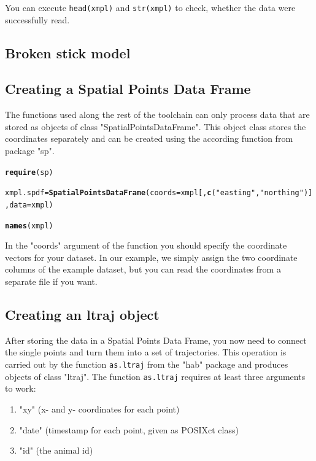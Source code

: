 \documentclass[11pt, a4paper]{article}\usepackage[]{graphicx}\usepackage[]{color}
\makeatletter
\newcommand{\hlstr}[1]{\textcolor[rgb]{0.192,0.494,0.8}{#1}}%
\newcommand{\hlstd}[1]{\textcolor[rgb]{0.345,0.345,0.345}{#1}}%
\newcommand{\hlkwb}[1]{\textcolor[rgb]{0.69,0.353,0.396}{#1}}%
\newcommand{\hlkwc}[1]{\textcolor[rgb]{0.333,0.667,0.333}{#1}}%
\newcommand{\hlkwd}[1]{\textcolor[rgb]{0.737,0.353,0.396}{\textbf{#1}}}%
\newenvironment{kframe}{%
 \def\at@end@of@kframe{}%
 \ifinner\ifhmode%
  \def\at@end@of@kframe{\end{minipage}}%
  \begin{minipage}{\columnwidth}%
 \fi\fi%
 \def\FrameCommand##1{\hskip\@totalleftmargin \hskip-\fboxsep
 \colorbox{shadecolor}{##1}\hskip-\fboxsep
     \hskip-\linewidth \hskip-\@totalleftmargin \hskip\columnwidth}%
 \MakeFramed {\advance\hsize-\width
   \@totalleftmargin\z@ \linewidth\hsize
   \@setminipage}}%
 {\par\unskip\endMakeFramed%
 \at@end@of@kframe}
\newenvironment{knitrout}{}{} %
\makeatother
\begin{document}
\noindent You can execute \texttt{head(xmpl)} and \texttt{str(xmpl)} to check, whether the data were successfully read.

\subsection{Broken stick model}

\subsection{Creating a Spatial Points Data Frame}%
The functions used along the rest of the toolchain can only process data that are stored as objects of class "SpatialPointsDataFrame". This object class stores the coordinates separately and can be created using the according function from package "sp". 

\begin{knitrout}
\color{fgcolor}\begin{kframe}
\begin{alltt}
\hlkwd{require}\hlstd{(sp)}

\hlstd{xmpl.spdf} \hlkwb{=} \hlkwd{SpatialPointsDataFrame}\hlstd{(}\hlkwc{coords} \hlstd{= xmpl[,}\hlkwd{c}\hlstd{(}\hlstr{"easting"}\hlstd{,}\hlstr{"northing"}\hlstd{)],} \hlkwc{data} \hlstd{= xmpl)}

\hlkwd{names}\hlstd{(xmpl)}
\end{alltt}
\end{kframe}
\end{knitrout}
In the "coords" argument of the function you should specify the coordinate vectors for your dataset. In our example, we simply assign the two coordinate columns of the example dataset, but you can read the coordinates from a separate file if you want.


\subsection{Creating an ltraj object}%
After storing the data in a Spatial Points Data Frame, you now need to connect the single points and turn them into a set of trajectories. This operation is carried out by the function \texttt{as.ltraj} from the "hab" package and produces objects of class "ltraj".
The function \texttt{as.ltraj} requires at least three arguments to work:
\begin{enumerate}
\item{"xy" (x- and y- coordinates for each point)}
\item{"date" (timestamp for each point, given as POSIXct class)}
\item{"id" (the animal id)}
\end{enumerate}
\end{document}
